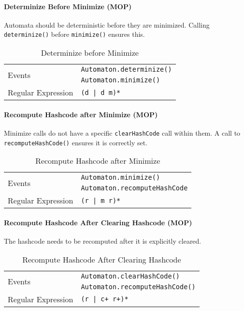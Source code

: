 \documentclass[letterpaper,sigplan]{acmart}
\begin{document}
\paragraph{Determinize Before Minimize (MOP)} Automata should be deterministic
before they are minimized. Calling \lstinline{determinize()} before
\lstinline{minimize()} ensures this.

\begin{table}[h]
  {\footnotesize
    \begin{tabular}{ll}
      \toprule
      \multirow{2}{*}{Events} & \texttt{Automaton.determinize()} \\
                              & \texttt{Automaton.minimize()} \\
      \midrule
      Regular Expression & \texttt{(d | d m)*} \\
      \bottomrule
    \end{tabular}
    \caption{Determinize before Minimize}%
    \label{tab:determinize-before-minimize}
  }
\end{table}

\paragraph{Recompute Hashcode after Minimize (MOP)} Minimize calls do not have
a specific \lstinline{clearHashCode} call within them.  A call to
\lstinline{recomputeHashCode()} ensures it is correctly set.

\begin{table}[h]
  {\footnotesize
    \begin{tabular}{ll}
      \toprule
      \multirow{2}{*}{Events} & \texttt{Automaton.minimize()} \\
                              & \texttt{Automaton.recomputeHashCode} \\
      \midrule
      Regular Expression & \texttt{(r | m r)*} \\
      \bottomrule
    \end{tabular}
    \caption{Recompute Hashcode after Minimize}%
    \label{tab:recompute-hash-after-minimize}
  }
\end{table}

\paragraph{Recompute Hashcode After Clearing Hashcode (MOP)} The hashcode needs
to be recomputed after it is explicitly cleared.

\begin{table}[h]
  {\footnotesize
    \begin{tabular}{ll}
      \toprule
      \multirow{2}{*}{Events} & \texttt{Automaton.clearHashCode()} \\
                              & \texttt{Automaton.recomputeHashCode()} \\
      \midrule
      Regular Expression & \texttt{(r | c+ r+)*} \\
      \bottomrule
    \end{tabular}
    \caption{Recompute Hashcode After Clearing Hashcode}%
    \label{tab:recompute-hash-after-clear-hash}
  }
\end{table}
\end{document}
